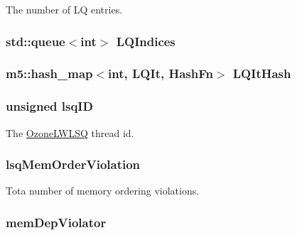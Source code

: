 \label{classOzoneLWLSQ_aafa99d800d574095881acbacdbbbcc47}
The number of LQ entries. \hypertarget{classOzoneLWLSQ_a78218da891879fae16fe75c73981f75f}{
\subsubsection[{LQIndices}]{\setlength{\rightskip}{0pt plus 5cm}std::queue$<$int$>$ {\bf LQIndices}}}
\label{classOzoneLWLSQ_a78218da891879fae16fe75c73981f75f}
\hypertarget{classOzoneLWLSQ_afd55cfcf685cda7dafc7c52d5105e129}{
\subsubsection[{LQItHash}]{\setlength{\rightskip}{0pt plus 5cm}m5::hash\_\-map$<$int, {\bf LQIt}, {\bf HashFn}$>$ {\bf LQItHash}}}
\label{classOzoneLWLSQ_afd55cfcf685cda7dafc7c52d5105e129}
\hypertarget{classOzoneLWLSQ_adfd96fbbaa327a31d20f0d4134418fad}{
\subsubsection[{lsqID}]{\setlength{\rightskip}{0pt plus 5cm}unsigned {\bf lsqID}}}
\label{classOzoneLWLSQ_adfd96fbbaa327a31d20f0d4134418fad}
The \hyperlink{classOzoneLWLSQ}{OzoneLWLSQ} thread id. \hypertarget{classOzoneLWLSQ_ac499fc2b461e03a110deae7c695f75bc}{
\subsubsection[{lsqMemOrderViolation}]{ {\bf lsqMemOrderViolation}}}
\label{classOzoneLWLSQ_ac499fc2b461e03a110deae7c695f75bc}
Tota number of memory ordering violations. \hypertarget{classOzoneLWLSQ_a270a20c3fa52139e0538288275db9d22}{
\subsubsection[{memDepViolator}]{ {\bf memDepViolator}}}
